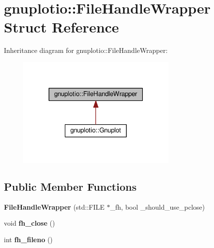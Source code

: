 \hypertarget{structgnuplotio_1_1_file_handle_wrapper}{}\section{gnuplotio\+:\+:File\+Handle\+Wrapper Struct Reference}
\label{structgnuplotio_1_1_file_handle_wrapper}


Inheritance diagram for gnuplotio\+:\+:File\+Handle\+Wrapper\+:\nopagebreak
\begin{figure}[H]
\begin{center}
\leavevmode
\includegraphics[width=225pt]{structgnuplotio_1_1_file_handle_wrapper__inherit__graph}
\end{center}
\end{figure}
\subsection*{Public Member Functions}
\begin{DoxyCompactItemize}
\item 
{\bfseries File\+Handle\+Wrapper} (std\+::\+F\+I\+LE $\ast$\+\_\+fh, bool \+\_\+should\+\_\+use\+\_\+pclose)\hypertarget{structgnuplotio_1_1_file_handle_wrapper_a26b2378e193a9c41be5aed97e11f9411}{}\label{structgnuplotio_1_1_file_handle_wrapper_a26b2378e193a9c41be5aed97e11f9411}

\item 
void {\bfseries fh\+\_\+close} ()\hypertarget{structgnuplotio_1_1_file_handle_wrapper_acafac45efd9c78ce621af4f3228c6f67}{}\label{structgnuplotio_1_1_file_handle_wrapper_acafac45efd9c78ce621af4f3228c6f67}

\item 
int {\bfseries fh\+\_\+fileno} ()\hypertarget{structgnuplotio_1_1_file_handle_wrapper_a3202ccd15d624f26dd2cf699d3456de6}{}\label{structgnuplotio_1_1_file_handle_wrapper_a3202ccd15d624f26dd2cf699d3456de6}

\end{DoxyCompactItemize}
